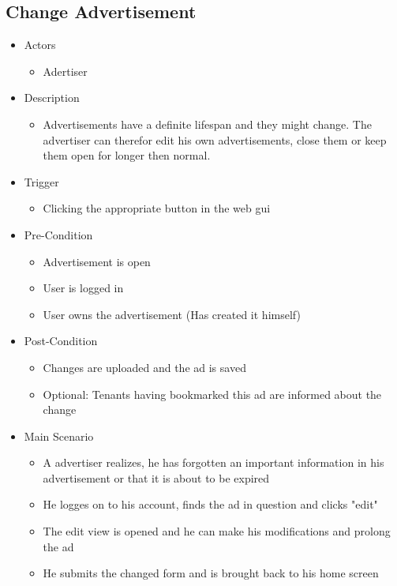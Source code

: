 \documentclass[a4paper,11pt]{article}
\begin{document}
\subsection*{Change Advertisement}
\begin{itemize}
	\item Actors
		\begin{itemize}
			\item Adertiser
		\end{itemize}
	\item Description
		\begin{itemize}
			\item Advertisements have a definite lifespan and they might change. The advertiser can therefor edit his own advertisements, close them or keep them open for longer then normal.
		\end{itemize}
	\item Trigger
		\begin{itemize}
			\item Clicking the appropriate button in the web gui
		\end{itemize}
	\item Pre-Condition
		\begin{itemize}
			\item Advertisement is open
			\item User is logged in
			\item User owns the advertisement (Has created it himself)
		\end{itemize}
	\item Post-Condition
		\begin{itemize}
			\item Changes are uploaded and the ad is saved
			\item Optional: Tenants having bookmarked this ad are informed about the change
		\end{itemize}
	\item Main Scenario
		\begin{itemize}
			\item A advertiser realizes, he has forgotten an important information in his advertisement or that it is about to be expired
			\item He logges on to his account, finds the ad in question and clicks "edit"
			\item The edit view is opened and he can make his modifications and prolong the ad
			\item He submits the changed form and is brought back to his home screen
		\end{itemize}
\end{itemize}
\end{document}
